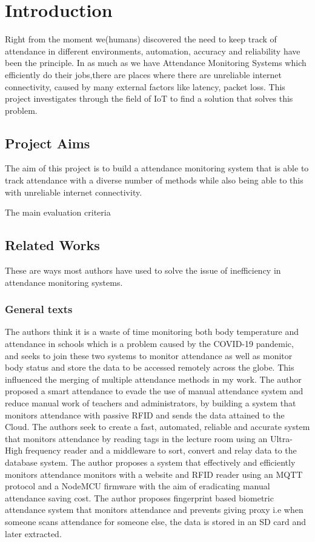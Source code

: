 \chapter{Introduction}
Right from the moment we(humans) discovered the need to keep track of attendance in different environments, automation, accuracy and reliability have been the principle. In as much as we have Attendance Monitoring Systems which efficiently do their jobs,there are places where there are unreliable internet connectivity, caused by many external factors like latency, packet loss. This project investigates through the field of IoT to find a solution that solves this problem.


\section{Project Aims}

The aim of this project is to build a attendance monitoring system that is able to track attendance with a diverse number of methods while also being able to this with unreliable internet connectivity. 

The main evaluation criteria


\section{Related Works} 
These are ways most authors have used to solve the issue of inefficiency in attendance monitoring systems.
\subsection{General texts}
The authors think it is a waste of time monitoring both body temperature and attendance in schools which is a problem caused by the COVID-19 pandemic, and seeks to join these two systems to monitor attendance as well as monitor body status and store the data to be accessed remotely across the globe\cite{KaziARP}. This influenced the merging of multiple attendance methods in my work.
The author proposed a smart attendance to evade the use of manual attendance system and reduce manual work of teachers and administrators, by building a system that monitors attendance with passive RFID and sends the data attained to the Cloud.
The authors seek to create a fast, automated, reliable and accurate system that monitors attendance by reading tags in the lecture room using an Ultra-High frequency reader and a middleware to sort, convert and relay data to the database system\cite{Www2012}. 
The author proposes a system that effectively and efficiently monitors attendance monitors with a website and RFID reader using an MQTT protocol and a NodeMCU firmware with the aim of eradicating manual attendance saving cost\cite{Bhagat2020}.
The author proposes fingerprint based biometric attendance system that monitors attendance and prevents giving proxy i.e when someone scans attendance for someone else, the data is stored in an SD card and later extracted. 

